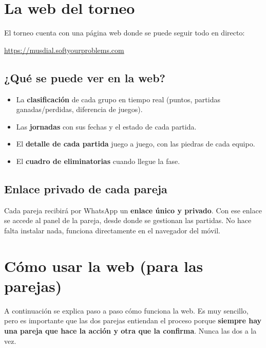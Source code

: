 \documentclass[11pt,a4paper]{article}
\begin{document}
\section{La web del torneo}

El torneo cuenta con una página web donde se puede seguir todo en directo:

\begin{center}
\large\url{https://musdial.softyourproblems.com}
\end{center}

\subsection{¿Qué se puede ver en la web?}

\begin{itemize}
    \item La \textbf{clasificación} de cada grupo en tiempo real (puntos, partidas ganadas/perdidas, diferencia de juegos).
    \item Las \textbf{jornadas} con sus fechas y el estado de cada partida.
    \item El \textbf{detalle de cada partida} juego a juego, con las piedras de cada equipo.
    \item El \textbf{cuadro de eliminatorias} cuando llegue la fase.
\end{itemize}

\subsection{Enlace privado de cada pareja}

Cada pareja recibirá por WhatsApp un \textbf{enlace único y privado}. Con ese enlace se accede al panel de la pareja, desde donde se gestionan las partidas. No hace falta instalar nada, funciona directamente en el navegador del móvil.

\section{Cómo usar la web (para las parejas)}

A continuación se explica paso a paso cómo funciona la web. Es muy sencillo, pero es importante que las dos parejas entiendan el proceso porque \textbf{siempre hay una pareja que hace la acción y otra que la confirma}. Nunca las dos a la vez.
\end{document}
